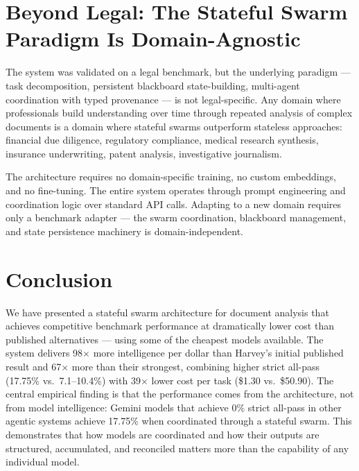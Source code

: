 \documentclass[11pt,a4paper]{article}
\begin{document}

\section{Beyond Legal: The Stateful Swarm Paradigm Is Domain-Agnostic}

The system was validated on a legal benchmark, but the underlying paradigm — task decomposition, persistent blackboard state-building, multi-agent coordination with typed provenance — is not legal-specific. Any domain where professionals build understanding over time through repeated analysis of complex documents is a domain where stateful swarms outperform stateless approaches: financial due diligence, regulatory compliance, medical research synthesis, insurance underwriting, patent analysis, investigative journalism.

The architecture requires no domain-specific training, no custom embeddings, and no fine-tuning. The entire system operates through prompt engineering and coordination logic over standard API calls. Adapting to a new domain requires only a benchmark adapter — the swarm coordination, blackboard management, and state persistence machinery is domain-independent.


\section{Conclusion}

We have presented a stateful swarm architecture for document analysis that achieves competitive benchmark performance at dramatically lower cost than published alternatives — using some of the cheapest models available. The system delivers 98$\times$ more intelligence per dollar than Harvey's initial published result and 67$\times$ more than their strongest, combining higher strict all-pass (17.75\% vs.\ 7.1--10.4\%) with 39$\times$ lower cost per task (\$1.30 vs.\ \$50.90). The central empirical finding is that the performance comes from the architecture, not from model intelligence: Gemini models that achieve 0\% strict all-pass in other agentic systems achieve 17.75\% when coordinated through a stateful swarm. This demonstrates that how models are coordinated and how their outputs are structured, accumulated, and reconciled matters more than the capability of any individual model.
\end{document}
